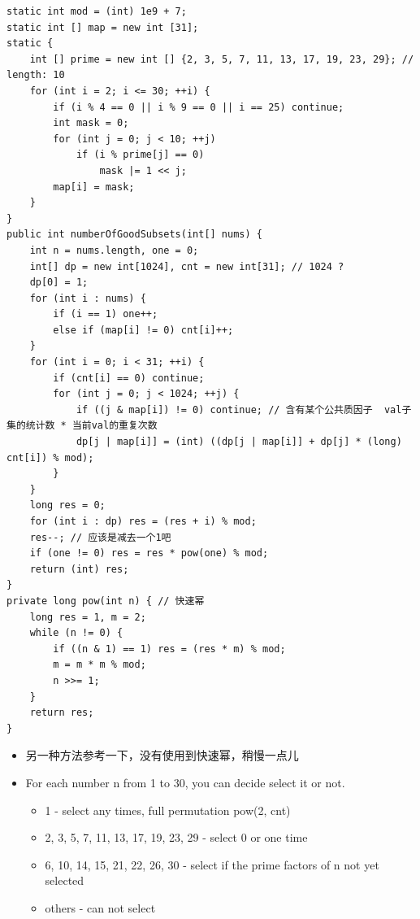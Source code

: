 \documentclass[9pt, b5paaper]{book}
\begin{document}
\begin{verbatim}
static int mod = (int) 1e9 + 7;
static int [] map = new int [31];
static {
    int [] prime = new int [] {2, 3, 5, 7, 11, 13, 17, 19, 23, 29}; // length: 10
    for (int i = 2; i <= 30; ++i) {
        if (i % 4 == 0 || i % 9 == 0 || i == 25) continue;
        int mask = 0;
        for (int j = 0; j < 10; ++j) 
            if (i % prime[j] == 0)
                mask |= 1 << j;
        map[i] = mask;
    }
}
public int numberOfGoodSubsets(int[] nums) {
    int n = nums.length, one = 0;
    int[] dp = new int[1024], cnt = new int[31]; // 1024 ?
    dp[0] = 1;
    for (int i : nums) {
        if (i == 1) one++;
        else if (map[i] != 0) cnt[i]++;
    }
    for (int i = 0; i < 31; ++i) {
        if (cnt[i] == 0) continue;
        for (int j = 0; j < 1024; ++j) {
            if ((j & map[i]) != 0) continue; // 含有某个公共质因子  val子集的统计数 * 当前val的重复次数   
            dp[j | map[i]] = (int) ((dp[j | map[i]] + dp[j] * (long) cnt[i]) % mod);
        }
    }
    long res = 0;
    for (int i : dp) res = (res + i) % mod;
    res--; // 应该是减去一个1吧
    if (one != 0) res = res * pow(one) % mod;
    return (int) res;
}
private long pow(int n) { // 快速幂
    long res = 1, m = 2;
    while (n != 0) {
        if ((n & 1) == 1) res = (res * m) % mod;
        m = m * m % mod;
        n >>= 1;
    }
    return res;
}
\end{verbatim}
\begin{itemize}
\item 另一种方法参考一下，没有使用到快速幂，稍慢一点儿
\item For each number n from 1 to 30, you can decide select it or not.
\begin{itemize}
\item 1 - select any times, full permutation pow(2, cnt)
\item 2, 3, 5, 7, 11, 13, 17, 19, 23, 29 - select 0 or one time
\item 6, 10, 14, 15, 21, 22, 26, 30 - select if the prime factors of n not yet selected
\item others - can not select
\end{itemize}
\end{itemize}
\end{document}
